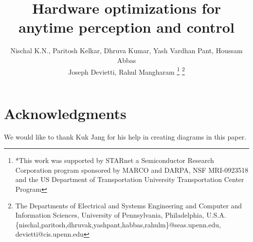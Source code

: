\documentclass[a4paper, 10pt, conference]{ieeeconf}      %
\title{\LARGE \bf
Hardware optimizations for anytime perception and control
}
\author{ Nischal K.N., Paritosh Kelkar, Dhruva Kumar, Yash Vardhan Pant, Houssam Abbas\\
	 Joseph Devietti, Rahul Mangharam%
\thanks{*This work was supported by STARnet a Semiconductor Research
Corporation program sponsored by MARCO and DARPA, NSF MRI-0923518 and the US Department of Transportation University Transportation Center Program}%
\thanks{The Departments of Electrical and Systems Engineering and Computer and Information Sciences, University of Pennsylvania, Philadelphia, U.S.A.
        {\small
        \{nischal,paritosh,dhruvak,yashpant,habbas,rahulm\}@seas.upenn.edu, devietti@cis.upenn.edu}}%
}
\begin{document}
\maketitle
\thispagestyle{empty}
\pagestyle{empty}


%
%
%


\section*{Acknowledgments}
We would like to thank Kuk Jang for his help in creating diagrams in this paper.
	


	
\end{document}

